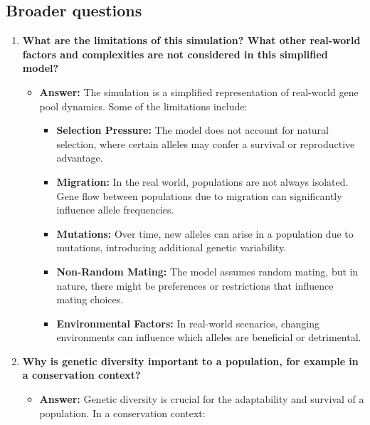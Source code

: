 \documentclass[
  a4paper]{book}
\providecommand{\tightlist}{%
  \setlength{\itemsep}{0pt}\setlength{\parskip}{0pt}}
\begin{document}
\hypertarget{broader-questions}{%
\subsection{Broader questions}\label{broader-questions}}

\begin{enumerate}
\def\labelenumi{\arabic{enumi}.}
\tightlist
\item
  \textbf{What are the limitations of this simulation? What other real-world factors and complexities are not considered in this simplified model?}

  \begin{itemize}
  \tightlist
  \item
    \textbf{Answer:} The simulation is a simplified representation of real-world gene pool dynamics. Some of the limitations include:

    \begin{itemize}
    \tightlist
    \item
      \textbf{Selection Pressure:} The model does not account for natural selection, where certain alleles may confer a survival or reproductive advantage.
    \item
      \textbf{Migration:} In the real world, populations are not always isolated. Gene flow between populations due to migration can significantly influence allele frequencies.
    \item
      \textbf{Mutations:} Over time, new alleles can arise in a population due to mutations, introducing additional genetic variability.
    \item
      \textbf{Non-Random Mating:} The model assumes random mating, but in nature, there might be preferences or restrictions that influence mating choices.
    \item
      \textbf{Environmental Factors:} In real-world scenarios, changing environments can influence which alleles are beneficial or detrimental.
    \end{itemize}
  \end{itemize}
\item
  \textbf{Why is genetic diversity important to a population, for example in a conservation context?}

  \begin{itemize}
  \tightlist
  \item
    \textbf{Answer:} Genetic diversity is crucial for the adaptability and survival of a population. In a conservation context:


\end{itemize}
\end{enumerate}
\end{document}
